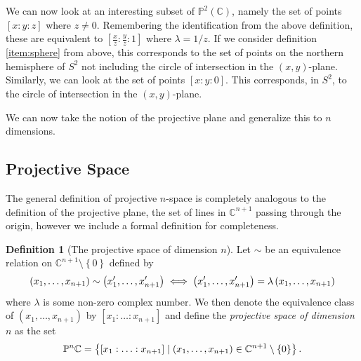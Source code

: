 \documentclass[a4paper]{article}
\theoremstyle{definition}
\newtheorem{defn}{Definition}
\theoremstyle{plain}
\newcommand{\C}{\ensuremath{\mathbb{C}}}
\newcommand{\proj}{\ensuremath{\mathbb{P}}}
\begin{document}
    We can now look at an interesting subset of $\proj^2(\C)$, namely the set
    of points $\left[x : y : z \right]$ where $z \neq 0$. Remembering the
    identification from the above definition, these are equivalent to $\left[
    \frac{x}{z} : \frac{y}{z} : 1 \right]$ where $\lambda = 1 / z$. If we
    consider definition \cref{item:sphere} from above, this corresponds to the
    set of points on the northern hemisphere of $S^2$ not including the circle
    of intersection in the $(x, y)$-plane. Similarly, we can look at the set of
    points $\left[ x : y : 0 \right]$. This corresponds, in $S^2$, to the circle
    of intersection in the $(x, y)$-plane.

    We can now take the notion of the
    projective plane and generalize this to $n$ dimensions.
    
    \subsection{Projective Space}
    \label{sub:projective_space}
    
    The general definition of projective $n$-space is completely analogous to
    the definition of the projective plane, the set of lines in $\C^{n+1}$
    passing through the origin, however we include a formal definition for
    completeness.

    \begin{defn}[The projective space of dimension $n$]
        Let $\sim$ be an equivalence relation on $\C^{n+1} \setminus \left\{ 0
        \right\}$ defined by
        \begin{equation}
            \notag
            \left( x_1, \ldots, x_{n+1} \right) \sim \left( x_1', \ldots,
            x_{n+1}' \right) \iff \left( x_1', \ldots, x_{n+1}' \right) =
            \lambda \left( x_1, \ldots, x_{n+1} \right)
        \end{equation}
        where $\lambda$ is some non-zero complex number. We then denote the
        equivalence class of $\left( x_1, \ldots, x_{n+1} \right)$ by $\left[
        x_1 : \ldots : x_{n+1} \right]$ and define the \emph{projective space
        of dimension $n$} as the set
        \begin{equation}
            \notag
            \proj^n{\C} = \left\{ \left[ x_1 : \ldots : x_{n+1} \right] \mid
            \left( x_1, \ldots, x_{n+1} \right) \in \C^{n+1} \setminus \left\{
            0 \right\} \right\}.
        \end{equation}
    \end{defn}
    
\end{document}
